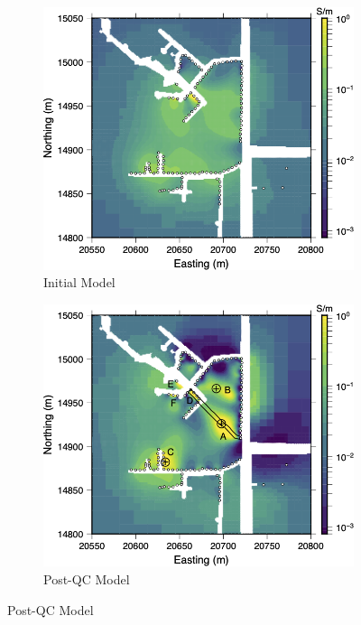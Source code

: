 \documentclass[final,authoryear,5p,times,twocolumn]{elsarticle}
\begin{document}
\begin{figure}[!ht]
   \centering

   \begin{subfigure}[b]{0.95\linewidth}
       \centering
       \includegraphics[trim=0cm 0cm 0cm 0cm, clip=true, width=\linewidth]{./Figures/Fig17a.png}
       \caption{Initial Model}
       \label{fig:CaseStudy_InvMod_Full}
   \end{subfigure}

   \vspace{1em}

   \begin{subfigure}[b]{0.95\linewidth}
       \centering
       \includegraphics[trim=0cm 0cm 0cm 0cm, clip=true, width=\linewidth]{./Figures/Fig17b.png}
       \caption{Post-QC Model}
       \label{fig:CaseStudy_InvMod_Final}
   \end{subfigure}


\end{figure}
\end{document}
